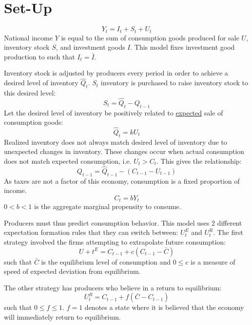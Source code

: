 \documentclass[]{article}
\begin{document}
\section*{Set-Up}
\begin{equation*}
    Y_t=I_t+S_t+U_t
\end{equation*}
National income $Y$ is equal to the sum of consumption goods produced for sale $U$, inventory stock $S$, and investment goods $I$. This model fixes investment good production to such that $I_t=\bar I$.

Inventory stock is adjusted by producers every period in order to achieve a desired level of inventory $\hat Q_t$. $S_t$ inventory is purchased to raise inventory stock to this desired level:
\begin{equation*}
    S_t=\hat Q_t-Q_{t-1}
\end{equation*}
Let the desired level of inventory be positively related to \underline{expected} sale of consumption goods:
\begin{equation*}
	\hat Q_t=k U_t
\end{equation*}
Realized inventory does not always match desired level of inventory due to unexpected changes in inventory. These changes occur when actual consumption does not match expected consumption, i.e. $U_t>C_t$. This gives the relationship:
\begin{equation*}
	Q_{t-1}=\hat Q_{t-1}-(C_{t-1}-U_{t-1})
\end{equation*}
As taxes are not a factor of this economy, consumption is a fixed proportion of income.
\begin{equation*}
	C_t=bY_t
\end{equation*}
$0<b<1$ is the aggregate marginal propensity to consume. 

Producers must thus predict consumption behavior. This model uses 2 different expectation formation rules that they can switch between: $U_t^E$ and $U_t^R$. The first strategy involved the firms attempting to extrapolate future consumption:
\begin{equation*}
	U+t^E=C_{t-1}+c(C_{t-1}-\bar C)
\end{equation*}
such that $\bar C$ is the equilibrium level of consumption and $0\leq c$ is a measure of speed of expected deviation from equilibrium.

The other strategy has producers who believe in a return to equilibrium:
\begin{equation*}
	U_t^R=C_{t-1}+f(\bar C-C_{t-1})
\end{equation*}
such that $0\leq f\leq 1$. $f=1$ denotes a state where it is believed that the economy will immediately return to equilibrium. 
\end{document}
